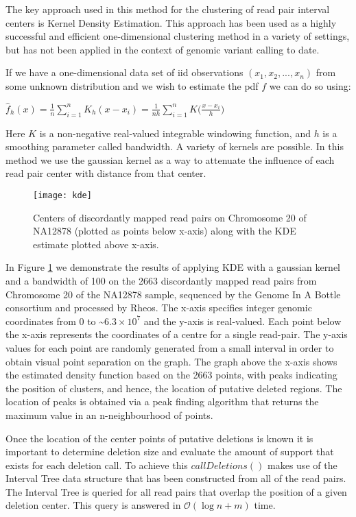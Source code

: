  The key approach used in this method for the clustering of read pair interval centers is Kernel Density Estimation. This approach has been used as a highly successful and efficient one-dimensional clustering method in a variety of settings\autocites{hartigan1975clustering}{kriegel2011density}{cuevas2001cluster}, but has not been applied in the context of genomic variant calling to date. 

 If we have a one-dimensional data set of iid observations $(x_1, x_2, ..., x_n)$ from some unknown distribution and we wish to estimate the pdf $f$ we can do so using:  

 $\widehat{f}_h(x) = \frac{1}{n}\sum_{i=1}^n K_h (x - x_i) = \frac{1}{nh} \sum_{i=1}^n K\Big(\frac{x-x_i}{h}\Big)$
 
 Here $K$ is a non-negative real-valued integrable windowing function, and $h$ is a smoothing parameter called bandwidth. A variety of kernels are possible. In this method we use the gaussian kernel as a way to attenuate the influence of each read pair center with distance from that center.

 \begin{figure}[H]
    \texttt{[image: kde]}
    \centering
    \caption {Centers of discordantly mapped read pairs on Chromosome 20 of NA12878 (plotted as points below x-axis) along with the KDE estimate plotted above x-axis.}
    \label{fig:kde}
\end{figure}

In Figure \ref{fig:kde} we demonstrate the results of applying KDE with a gaussian kernel and a bandwidth of 100 on the 2663 discordantly mapped read pairs from Chromosome 20 of the NA12878 sample, sequenced by the Genome In A Bottle\autocite{zook2018reproducible} consortium and processed by Rheos. The x-axis specifies integer genomic coordinates from 0 to \~$6.3\times10^7$ and the y-axis is real-valued. Each point below the x-axis represents the coordinates of a centre for a single read-pair. The y-axis values for each point are randomly generated from a small interval in order to obtain visual point separation on the graph. The graph above the x-axis shows the estimated density function based on the 2663 points, with peaks indicating the position of clusters, and hence, the location of putative deleted regions. The location of peaks is obtained via a peak finding algorithm that returns the maximum value in an n-neighbourhood of points.

Once the location of the center points of putative deletions is known it is important to determine deletion size and evaluate the amount of support that exists for each deletion call. To achieve this $callDeletions()$ makes use of the Interval Tree data structure that has been constructed from all of the read pairs. The Interval Tree is queried for all read pairs that overlap the position of a given deletion center. This query is answered in $\mathcal{O}(\log{}n + m)$ time. 

